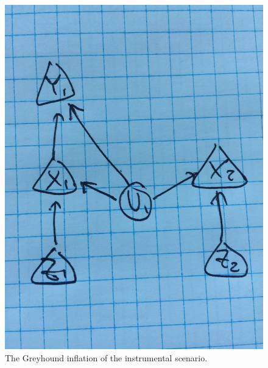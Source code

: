 \documentclass[aps,english,superscriptaddress,onecolumn,twoside,longbibliography,pra,floatfix,fleqn,nofootinbib]{revtex4-1}%
\theoremstyle{definition}
\begin{document}
\begin{figure}[htb]
\begin{minipage}[htb]{0.5\linewidth}
\includegraphics[scale=0.1]{InstrumentalInflation.jpg}
\caption{The Greyhound inflation of the instrumental scenario.}\label{fig:InflatedInstrumental}
\end{minipage}
\end{figure}
\end{document}
